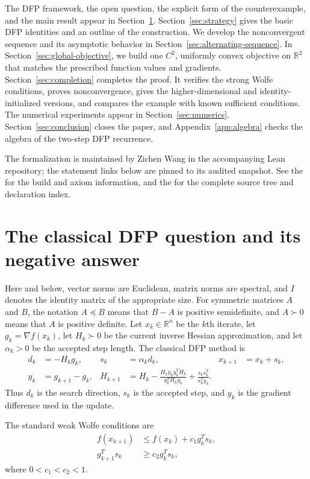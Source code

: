 \documentclass[11pt]{article}
\newcommand{\R}{\mathbb R}
\begin{document}
The DFP framework, the open question, the explicit form of the counterexample,
and the main result appear in Section~\ref{sec:statement}.
Section~\ref{sec:strategy} gives the basic DFP identities and an outline of
the construction.  We develop the nonconvergent sequence and its asymptotic behavior in
Section~\ref{sec:alternating-sequence}.  In
Section~\ref{sec:global-objective}, we build one $C^2$, uniformly convex
objective on $\R^2$ that matches the prescribed function values and gradients.
Section~\ref{sec:completion} completes the
proof.  It verifies the strong Wolfe conditions, proves nonconvergence, gives
the higher-dimensional and identity-initialized versions, and compares the
example with known sufficient conditions.  The numerical experiments appear
in Section~\ref{sec:numerics}.  Section~\ref{sec:conclusion} closes the paper,
and Appendix~\ref{app:algebra} checks the algebra of the two-step DFP
recurrence.

The formalization is maintained by Zichen Wang in the accompanying Lean
repository; the statement links below are pinned to its audited snapshot.
See the  for the build and axiom information, and
the  for the complete source tree and declaration index.

\section{The classical DFP question and its negative answer}
\label{sec:statement}

Here and below, vector norms are Euclidean, matrix norms are spectral, and $I$
denotes the identity matrix of the appropriate size.  For symmetric matrices
$A$ and $B$, the notation $A\preceq B$ means that $B-A$ is positive
semidefinite, and $A\succ0$ means that $A$ is positive definite.  Let
$x_k\in\R^n$ be the $k$th iterate, let $g_k=\nabla f(x_k)$, let $H_k\succ0$ be
the current inverse Hessian approximation, and let $\alpha_k>0$ be the
accepted step length.  The classical DFP method is
\begin{align*}
d_k&=-H_kg_k,&s_k&=\alpha_kd_k,&x_{k+1}&=x_k+s_k,\\
y_k&=g_{k+1}-g_k,&
H_{k+1}&=H_k-
\frac{H_ky_ky_k^TH_k}{y_k^TH_ky_k}
+\frac{s_ks_k^T}{s_k^Ty_k}.
\end{align*}
Thus $d_k$ is the search direction, $s_k$ is the accepted step, and
$y_k$ is the gradient difference used in the update.

The standard weak Wolfe conditions \cite{Wolfe1969} are
\begin{align}
f(x_{k+1})&\le f(x_k)+c_1g_k^Ts_k,\label{eq:armijo}\\
g_{k+1}^Ts_k&\ge c_2g_k^Ts_k,
\label{eq:weak-curvature}
\end{align}
where $0<c_1<c_2<1$.
\end{document}
